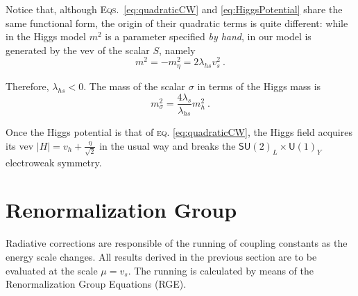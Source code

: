 \documentclass[aps,prd,preprintnumbers,nofootinbibn,twocolumn]{revtex4}
\begin{document}
Notice that, although \textsc{Eqs.}\ \eqref{eq:quadraticCW} and \eqref{eq:HiggsPotential} share the same functional form, the origin of their quadratic terms is quite different: while in the Higgs model $m^2$ is a parameter specified \textit{by hand}, in our model is generated by the vev of the scalar $S$, namely
\begin{equation}
m^2 = -m_\eta^2 = 2 \lambda_{hs} v_s^2\ .
\end{equation}

Therefore, $\lambda_{hs} < 0$. The mass of the scalar $\sigma$ in terms of the Higgs mass is
\begin{equation}
m_\sigma^2 = \frac{4\lambda_s}{\lambda_{hs}}m_h^2\ .
\end{equation}

Once the Higgs potential is that of \textsc{eq.} \eqref{eq:quadraticCW}, the Higgs field acquires its vev $|H| = v_h + \frac{\eta}{\sqrt{2}}$ in the usual way and breaks the $\mathsf{SU}(2)_L\times \mathsf{U}(1)_Y$ electroweak symmetry.

\section{Renormalization Group}\label{sect:RG}

Radiative corrections are responsible of the running of coupling constants as the energy scale changes. All results derived in the previous section are to be evaluated at the scale $\mu = v_s$. The running is calculated by means of the Renormalization Group Equations (RGE).
\end{document}
